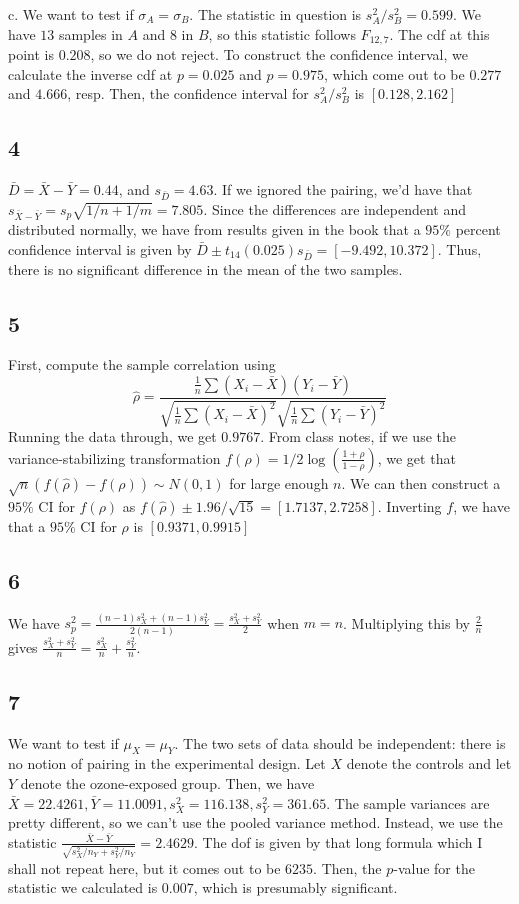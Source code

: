 \documentclass{article}
\begin{document}
\noindent c. We want to test if $\sigma_A=\sigma_B$. The statistic in question is $s_A^2/s_B^2=0.599$. We have $13$ samples in $A$ and $8$ in $B$, so this statistic follows $F_{12,7}$. The cdf at this point is $0.208$, so we do not reject. To construct the confidence interval, we calculate the inverse cdf at $p=0.025$ and $p=0.975$, which come out to be $0.277$ and $4.666$, resp. Then, the confidence interval for $s_A^2/s_B^2$ is $[0.128,2.162]$
\subsection*{4}
$\bar{D}=\bar{X}-\bar{Y}=0.44$, and $s_{\bar{D}}=4.63$. If we ignored the pairing, we'd have that $s_{\bar{X}-\bar{Y}}=s_p\sqrt{1/n+1/m}=7.805$. Since the differences are independent and distributed normally, we have from results given in the book that a $95\%$ percent confidence interval is given by $\bar{D}\pm t_{14}(0.025)s_{\bar{D}}=[-9.492,10.372]$. Thus, there is no significant difference in the mean of the two samples. 
\subsection*{5}
First, compute the sample correlation using 
$$\hat{\rho}=\frac{\frac{1}{n}\sum(X_i-\bar{X})(Y_i-\bar{Y})}{\sqrt{\frac{1}{n}\sum(X_i-\bar{X})^2}\sqrt{\frac{1}{n}\sum(Y_i-\bar{Y})^2}}$$
Running the data through, we get $0.9767$. From class notes, if we use the variance-stabilizing transformation $f(\rho)=1/2\log\left(\frac{1+\rho}{1-\rho}\right)$, we get that $\sqrt{n}(f(\hat{\rho})-f(\rho))\sim N(0,1)$ for large enough $n$. We can then construct a $95\%$ CI for $f(\rho)$ as $f(\hat{\rho})\pm1.96/\sqrt{15}=[1.7137,2.7258]$. Inverting $f$, we have that a $95\%$ CI for $\rho$ is $[0.9371,0.9915]$
\subsection*{6}
We have $s_p^2=\frac{(n-1)s_X^2+(n-1)s_Y^2}{2(n-1)}=\frac{s_X^2+s_Y^2}{2}$ when $m=n$. Multiplying this by $\frac{2}{n}$ gives $\frac{s_X^2+s_Y^2}{n}=\frac{s_X^2}{n}+\frac{s_Y^2}{n}$.
\subsection*{7}
We want to test if $\mu_X=\mu_Y$. The two sets of data should be independent: there is no notion of pairing in the experimental design. Let $X$ denote the controls and let $Y$ denote the ozone-exposed group. Then, we have $\bar{X}=22.4261,\bar{Y}=11.0091,s_X^2=116.138,s_Y^2=361.65$. The sample variances are pretty different, so we can't use the pooled variance method.  Instead, we use the statistic $\frac{\bar{X}-\bar{Y}}{\sqrt{s_X^2/n_Y+s_Y^2/n_Y}}=2.4629$. The dof is given by that long formula which I shall not repeat here, but it comes out to be $6235$. Then, the $p$-value for the statistic we calculated is $0.007$, which is presumably significant. 
\end{document}
